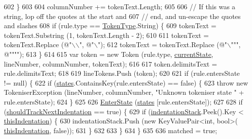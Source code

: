 \begin{DoxyCode}
602                     \}
603 
604                     columnNumber += tokenText.Length;
605 
606                     \textcolor{comment}{// If this was a string, lop off the quotes at the start and}
607                     \textcolor{comment}{// end, and un-escape the quotes and slashes}
608                     \textcolor{keywordflow}{if} (rule.type == \hyperlink{a00051_a301aa7c866593a5b625a8fc158bbeace}{TokenType}.String) \{
609                         tokenText = tokenText.Substring (1, tokenText.Length - 2);
610 
611                         tokenText = tokenText.Replace (\textcolor{stringliteral}{@"\(\backslash\)\(\backslash\)"}, \textcolor{stringliteral}{@"\(\backslash\)"});
612                         tokenText = tokenText.Replace (\textcolor{stringliteral}{@"\(\backslash\)"""}, \textcolor{stringliteral}{@""""});
613                     \}
614 
615                     var token = \textcolor{keyword}{new} Token (rule.type, \hyperlink{a00127_ac90b7dce8103425a148f9e8588f14137}{currentState}, lineNumber, columnNumber, 
      tokenText);
616 
617                     token.delimitsText = rule.delimitsText;
618 
619                     lineTokens.Push (token);
620 
621                     \textcolor{keywordflow}{if} (rule.entersState != null) \{
622                         \textcolor{keywordflow}{if} (\hyperlink{a00127_a2c65c0ba90f973e459583badefef216a}{states}.ContainsKey(rule.entersState) == \textcolor{keyword}{false}) \{
623                             \textcolor{keywordflow}{throw} \textcolor{keyword}{new} TokeniserException (lineNumber, columnNumber, \textcolor{stringliteral}{"Unknown tokeniser
       state "} + rule.entersState);
624                         \}
625 
626                         \hyperlink{a00127_ad3ef08f822b310d9864774b057b96995}{EnterState} (\hyperlink{a00127_a2c65c0ba90f973e459583badefef216a}{states} [rule.entersState]);
627 
628                         \textcolor{keywordflow}{if} (\hyperlink{a00127_ac670aac2245cbd4694dfbd5b69313218}{shouldTrackNextIndentation} == \textcolor{keyword}{true}) \{
629                             \textcolor{keywordflow}{if} (\hyperlink{a00127_a6631a1b1a9109258ab18927e7587ff9b}{indentationStack}.Peek().Key < 
      \hyperlink{a00348_a0e59365a4aa5811f6495b92a51e23573}{thisIndentation}) \{
630                                 indentationStack.Push (\textcolor{keyword}{new} KeyValuePair<int, bool>(
      \hyperlink{a00348_a0e59365a4aa5811f6495b92a51e23573}{thisIndentation}, \textcolor{keyword}{false}));
631                             \}
632 
633                         \}
634                     \}
635 
636                     matched = \textcolor{keyword}{true};

\end{DoxyCode}
